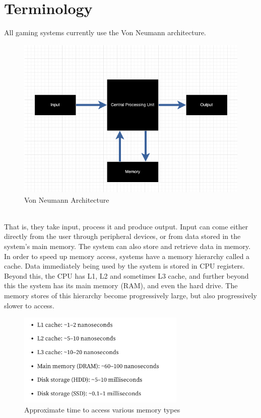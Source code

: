 \documentclass{article}
\begin{document}
\section{Terminology}
All gaming systems currently use the Von Neumann architecture.\\
\begin{figure}[h]
\includegraphics[width=\textwidth]{neumann}
\caption{Von Neumann Architecture}
\end{figure}
\\
That is, they take input, process it and produce output. Input can come either directly from the user through peripheral devices, or from data stored in the system's main memory. The system can also store and retrieve data in memory. In order to speed up memory access, systems have a memory hierarchy called a cache. Data immediately being used by the system is stored in CPU registers. Beyond this, the CPU has L1, L2 and sometimes L3 cache, and further beyond this the system has its main memory (RAM), and even the hard drive. The memory stores of this hierarchy become progressively large, but also progressively slower to access.\\
\begin{figure}[h]
	\centering
	\includegraphics[width=8cm]{access_time}
	\caption{Approximate time to access various memory types \cite{accessTime}}
\end{figure}
\end{document}
